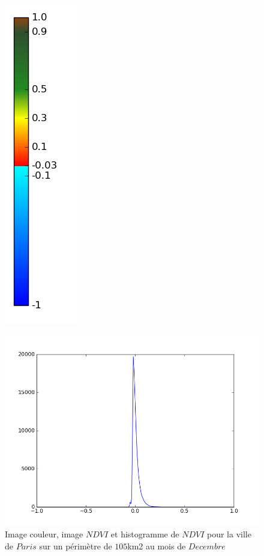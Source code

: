 \documentclass{book}
\begin{document}
\begin{figure}[H]
{\includegraphics[scale=0.4]{images/colormap.png}
}
\begin{center}
\includegraphics[scale=0.4]{images/Paris/12_ndvi_histo.png}
\end{center}
\caption{Image couleur, image $NDVI$ et histogramme de $NDVI$ pour la ville de $Paris$ sur un périmètre de $105$km2 au mois de $Decembre$}
\label{paris_ndvi}
\end{figure}
\end{document}
